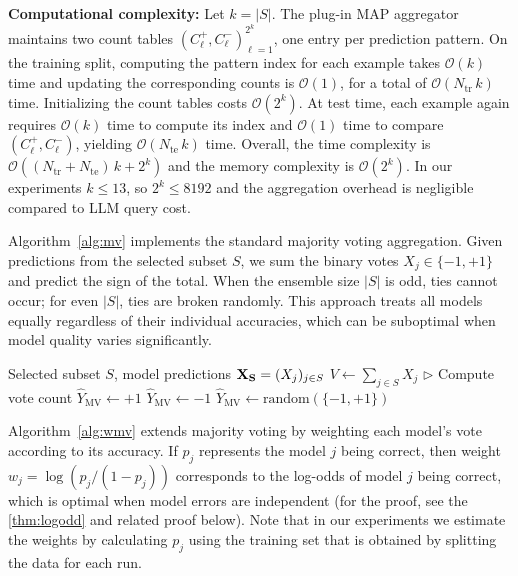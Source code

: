 \documentclass{article}
\theoremstyle{plain}
\theoremstyle{definition}
\theoremstyle{remark}
\begin{document}
\noindent\textbf{Computational complexity:}
Let $k=|S|$. The plug-in MAP aggregator maintains two count tables $(C^+_\ell, C^-_\ell)_{\ell=1}^{2^k}$, one entry per prediction pattern.
On the training split, computing the pattern index for each example takes $\mathcal{O}(k)$ time and updating the corresponding counts is $\mathcal{O}(1)$, for a total of $\mathcal{O}(N_{\mathrm{tr}}\,k)$ time. Initializing the count tables costs $\mathcal{O}(2^k)$.
At test time, each example again requires $\mathcal{O}(k)$ time to compute its index and $\mathcal{O}(1)$ time to compare $(C^+_\ell, C^-_\ell)$, yielding $\mathcal{O}(N_{\mathrm{te}}\,k)$ time.
Overall, the time complexity is $\mathcal{O}((N_{\mathrm{tr}}+N_{\mathrm{te}})\,k + 2^k)$ and the memory complexity is $\mathcal{O}(2^k)$.
In our experiments $k\le 13$, so $2^k \le 8192$ and the aggregation overhead is negligible compared to LLM query cost.

Algorithm~\ref{alg:mv} implements the standard majority voting aggregation. Given predictions from the selected subset $S$, we sum the binary votes $X_j \in \{-1, +1\}$ and predict the sign of the total. When the ensemble size $|S|$ is odd, ties cannot occur; for even $|S|$, ties are broken randomly. This approach treats all models equally regardless of their individual accuracies, which can be suboptimal when model quality varies significantly.

\begin{algorithm}[ht]
\caption{Majority Voting (MV) Aggregation}
\label{alg:mv}
\begin{algorithmic}[1]
\REQUIRE Selected subset $S$, model predictions ${ \bf X_S} = (X_j)_{j \in S}$
\STATE $V \leftarrow \sum_{j \in S} X_j$ \hfill $\triangleright$ Compute vote count
    \STATE $\hat{Y}_{\text{MV}} \leftarrow +1$
    \STATE $\hat{Y}_{\text{MV}} \leftarrow -1$
\ELSE
    \STATE $\hat{Y}_{\text{MV}} \leftarrow \text{random}(\{-1, +1\})$ 
\ENDIF

\end{algorithmic}
\end{algorithm}

Algorithm~\ref{alg:wmv} extends majority voting by weighting each model's vote according to its accuracy. If $p_j$ represents the model $j$ being correct, then weight $w_j = \log(p_j / (1 - p_j))$ corresponds to the log-odds of model $j$ being correct, which is optimal when model errors are independent (for the proof, see the \cref{thm:logodd} and related proof below). Note that in our experiments we estimate the weights by calculating $p_j$ using the training set that is obtained by splitting the data for each run.
\end{document}

